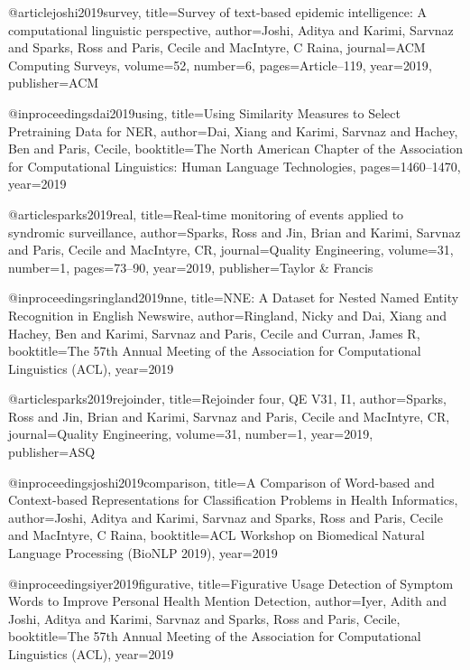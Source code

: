 @article{joshi2019survey,
  title={Survey of text-based epidemic intelligence: A computational linguistic perspective},
  author={Joshi, Aditya and Karimi, Sarvnaz and Sparks, Ross and Paris, Cecile and MacIntyre, C Raina},
  journal={ACM Computing Surveys},
  volume={52},
  number={6},
  pages={Article--119},
  year={2019},
  publisher={ACM}
}

@inproceedings{dai2019using,
  title={Using Similarity Measures to Select Pretraining Data for NER},
  author={Dai, Xiang and Karimi, Sarvnaz and Hachey, Ben and Paris, Cecile},
  booktitle={The North American Chapter of the Association for Computational Linguistics: Human Language Technologies},
  pages={1460--1470},
  year={2019}
}

@article{sparks2019real,
  title={Real-time monitoring of events applied to syndromic surveillance},
  author={Sparks, Ross and Jin, Brian and Karimi, Sarvnaz and Paris, Cecile and MacIntyre, CR},
  journal={Quality Engineering},
  volume={31},
  number={1},
  pages={73--90},
  year={2019},
  publisher={Taylor \& Francis}
}

@inproceedings{ringland2019nne,
  title={NNE: A Dataset for Nested Named Entity Recognition in English Newswire},
  author={Ringland, Nicky and Dai, Xiang and Hachey, Ben and Karimi, Sarvnaz and Paris, Cecile and Curran, James R},
  booktitle={The 57th Annual Meeting of the Association for Computational Linguistics (ACL)},
  year={2019}
}

@article{sparks2019rejoinder,
  title={Rejoinder four, QE V31, I1},
  author={Sparks, Ross and Jin, Brian and Karimi, Sarvnaz and Paris, Cecile and MacIntyre, CR},
  journal={Quality Engineering},
  volume={31},
  number={1},
  year={2019},
  publisher={ASQ}
}

@inproceedings{joshi2019comparison,
  title={A Comparison of Word-based and Context-based Representations for Classification Problems in Health Informatics},
  author={Joshi, Aditya and Karimi, Sarvnaz and Sparks, Ross and Paris, Cecile and MacIntyre, C Raina},
  booktitle={ACL Workshop on Biomedical Natural Language Processing (BioNLP 2019)},
  year={2019}
}

@inproceedings{iyer2019figurative,
  title={Figurative Usage Detection of Symptom Words to Improve Personal Health Mention Detection},
  author={Iyer, Adith and Joshi, Aditya and Karimi, Sarvnaz and Sparks, Ross and Paris, Cecile},
  booktitle={The 57th Annual Meeting of the Association for Computational Linguistics (ACL)},
  year={2019}
}

